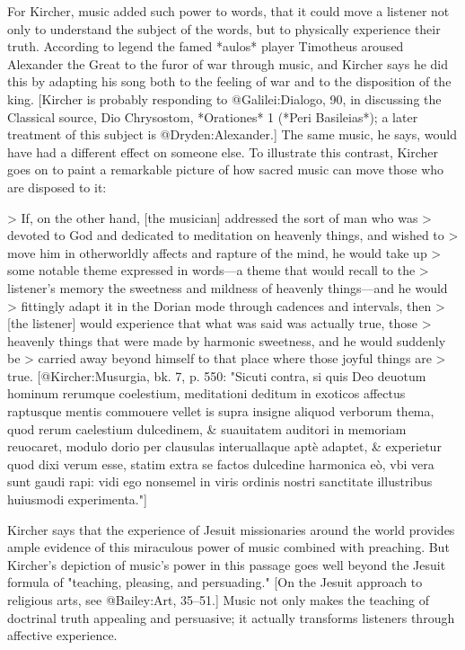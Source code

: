 For Kircher, music added such power to words, that it could move a listener not
only to understand the subject of the words, but to physically experience their
truth. 
According to legend the famed *aulos* player Timotheus aroused Alexander the
Great to the furor of war through music, and Kircher says he did this by
adapting his song both to the feeling of war and to the disposition of the king.
[Kircher is probably responding to @Galilei:Dialogo, 90, in discussing the
Classical source, Dio Chrysostom, *Orationes* 1 (*Peri Basileias*); a later
treatment of this subject is @Dryden:Alexander.]
The same music, he says, would have had a different effect on someone else.
To illustrate this contrast, Kircher goes on to paint a remarkable picture of
how sacred music can move those who are disposed to it:

> If, on the other hand, [the musician] addressed the sort of man who was
> devoted to God and dedicated to meditation on heavenly things, and wished to
> move him in otherworldly affects and rapture of the mind, he would take up
> some notable theme expressed in words---a theme that would recall to the
> listener's memory the sweetness and mildness of heavenly things---and he would
> fittingly adapt it in the Dorian mode through cadences and intervals, then
> [the listener] would experience that what was said was actually true, those
> heavenly things that were made by harmonic sweetness, and he would suddenly be
> carried away beyond himself to that place where those joyful things are
> true. 
[@Kircher:Musurgia, bk. 7, p. 550: "Sicuti contra, si quis Deo deuotum hominum
rerumque coelestium, meditationi deditum in exoticos affectus raptusque mentis
commouere vellet is supra insigne aliquod verborum thema, quod rerum caelestium
dulcedinem, & suauitatem auditori in memoriam reuocaret, modulo dorio per
clausulas interuallaque aptè adaptet, & experietur quod dixi verum esse, statim
extra se factos dulcedine harmonica eò, vbi vera sunt gaudi rapi: vidi ego
nonsemel in viris ordinis nostri sanctitate illustribus huiusmodi
experimenta."]

Kircher says that the experience of Jesuit missionaries around the world
provides ample evidence of this miraculous power of music combined with
preaching. 
But Kircher's depiction of music's power in this passage goes well beyond the
Jesuit formula of "teaching, pleasing, and persuading."
[On the Jesuit approach to religious arts, see @Bailey:Art, 35--51.]
Music not only makes the teaching of doctrinal truth appealing and persuasive;
it actually transforms listeners through affective experience. 

